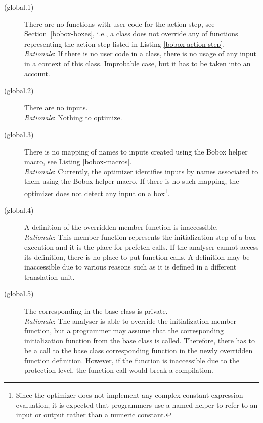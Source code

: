 \begin{description}
\item[(global.1)]{There are no functions with user code for the action step, see Section~\ref{bobox-boxes}, i.e., a class does not override any of functions representing the action step listed in Listing \ref{bobox-action-step}.\\
\emph{Rationale}: If there is no user code in a class, there is no usage of any input in a context of this class. Improbable case, but it has to be taken into an account.
}

\item[(global.2)]{There are no inputs.\\
\emph{Rationale}: Nothing to optimize. 
}

\item[(global.3)]{There is no mapping of names to inputs created using the Bobox helper macro, see Listing \ref{bobox-macros}.\\
\emph{Rationale}: Currently, the optimizer identifies inputs by names associated to them using the Bobox helper macro. If there is no such mapping, the optimizer does not detect any input on a box\footnote{Since the optimizer does not implement any complex constant expression evaluation, it is expected that programmers use a named helper to refer to an input or output rather than a numeric constant.}.
}

\item[(global.4)]{A definition of the overridden  member function is inaccessible.\\
\emph{Rationale}: This member function represents the initialization step of a box execution and it is the place for prefetch calls. If the analyser cannot access its definition, there is no place to put function calls. A definition may be inaccessible due to various reasons such as it is defined in a different translation unit.
}

\item[(global.5)]{The corresponding  in the base class is private.\\
\emph{Rationale}: The analyser is able to override the initialization member function, but a programmer may assume that the corresponding initialization function from the base class is called. Therefore, there has to be a call to the base class corresponding function in the newly overridden function definition. However, if the function is inaccessible due to the protection level, the function call would break a compilation.
}
\end{description}

